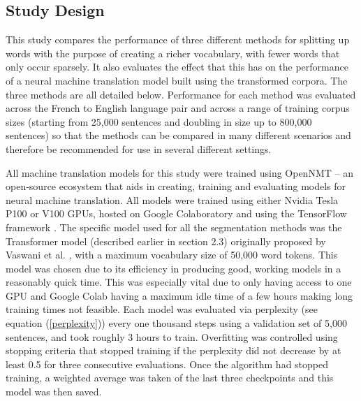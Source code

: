 \documentclass[11pt]{article}
\begin{document}
\subsection{Study Design}

This study compares the performance of three different methods for splitting up words with the purpose of creating a richer vocabulary, with fewer words that only occur sparsely. It also evaluates the effect that this has on the performance of a neural machine translation model built using the transformed corpora.  The three methods are all detailed below. Performance for each method was evaluated across the French to English language pair and across a range of training corpus sizes (starting from 25,000 sentences and doubling in size up to 800,000 sentences) so that the methods can be compared in many different scenarios and therefore be recommended for use in several different settings.

\bigskip

All machine translation models for this study were trained using OpenNMT \citep{klein-etal-2017-opennmt} -- an open-source ecosystem that aids in creating, training and evaluating models for neural machine translation. All models were trained using either Nvidia Tesla P100 or V100 GPUs, hosted on Google Colaboratory and using the TensorFlow framework \citep{tensorflow2015-whitepaper}. The specific model used for all the segmentation methods was the Transformer model (described earlier in section 2.3) originally proposed by Vaswani et al. \citeyearpar{vaswani2017attention}, with a maximum vocabulary size of 50,000 word tokens. %
This model was chosen due to its efficiency in producing good, working models in a reasonably quick time. This was especially vital due to only having access to one GPU and Google Colab having a maximum idle time of a few hours making long training times not feasible. Each model was evaluated via perplexity (see equation (\ref{perplexity})) every one thousand steps using a validation set of 5,000 sentences, and took roughly 3 hours to train.  Overfitting was controlled using stopping criteria that stopped training if the perplexity did not decrease by at least 0.5 for three consecutive evaluations. Once the algorithm had stopped training, a weighted average was taken of the last three checkpoints and this model was then saved.

\bigskip
\end{document}
